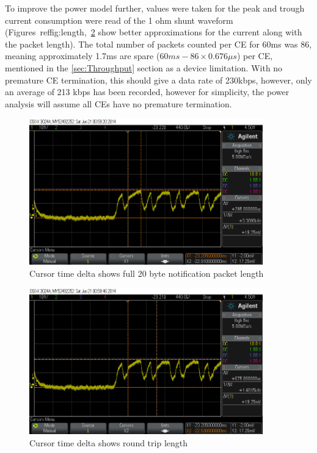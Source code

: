 \documentclass[]{article}
\begin{document}
To improve the power model further, values were taken for the peak and trough current consumption were read of the 1 ohm shunt waveform (Figures~ref{fig:length},~\ref{fig:lengthpkt} show better approximations for the current along with the packet length). The total number of packets counted per \ac{CE} for 60ms was 86, meaning approximately 1.7ms are spare ($60ms - 86 \times 0.676\mu s$) per \ac{CE}, mentioned in the \ref{sec:Throughput} section as a device limitation. With no premature \ac{CE} termination, this should give a data rate of 230kbps, however, only an average of 213 kbps has been recorded, however for simplicity, the power analysis will assume all \ac{CE}s have no premature termination.

\begin{figure}[H]
	\begin{center}
		\includegraphics[width = 0.9\textwidth]{length}
	\end{center}
	\caption{Cursor time delta shows full 20 byte notification packet length}
	\label{fig:length}
\end{figure}

\begin{figure}[H]
	\begin{center}
		\includegraphics[width = 0.9\textwidth]{lengthpkt}
	\end{center}
	\caption{Cursor time delta shows round trip length}
	\label{fig:lengthpkt}
\end{figure}
\end{document}
